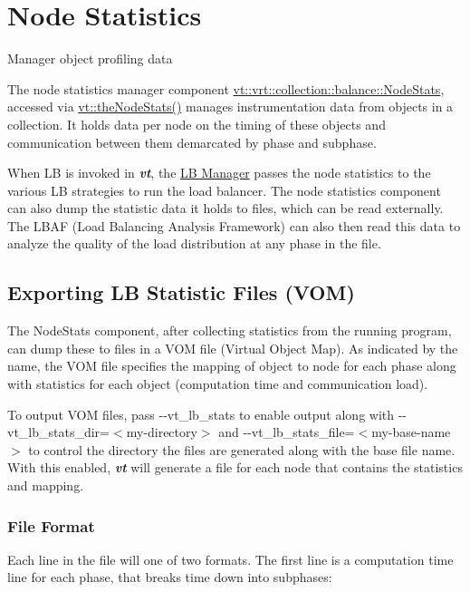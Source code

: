 \hypertarget{node-stats}{}\section{Node Statistics}\label{node-stats}
Manager object profiling data

The node statistics manager component {\ttfamily \hyperlink{structvt_1_1vrt_1_1collection_1_1balance_1_1_node_stats}{vt\+::vrt\+::collection\+::balance\+::\+Node\+Stats}}, accessed via {\ttfamily \hyperlink{namespacevt_ae1526efa346612ad330d9a628e596c54}{vt\+::the\+Node\+Stats()}} manages instrumentation data from objects in a collection. It holds data per node on the timing of these objects and communication between them demarcated by phase and subphase.

When LB is invoked in {\bfseries {\itshape vt}}, the \hyperlink{lb-manager}{LB Manager} passes the node statistics to the various LB strategies to run the load balancer. The node statistics component can also dump the statistic data it holds to files, which can be read externally. The L\+B\+AF (Load Balancing Analysis Framework) can also then read this data to analyze the quality of the load distribution at any phase in the file.\hypertarget{node-stats_export-lb-stats-file}{}\subsection{Exporting L\+B Statistic Files (\+V\+O\+M)}\label{node-stats_export-lb-stats-file}
The {\ttfamily Node\+Stats} component, after collecting statistics from the running program, can dump these to files in a V\+OM file (Virtual Object Map). As indicated by the name, the V\+OM file specifies the mapping of object to node for each phase along with statistics for each object (computation time and communication load).

To output V\+OM files, pass {\ttfamily -\/-\/vt\+\_\+lb\+\_\+stats} to enable output along with {\ttfamily -\/-\/vt\+\_\+lb\+\_\+stats\+\_\+dir=$<$my-\/directory$>$} and {\ttfamily -\/-\/vt\+\_\+lb\+\_\+stats\+\_\+file=$<$my-\/base-\/name$>$} to control the directory the files are generated along with the base file name. With this enabled, {\bfseries {\itshape vt}} will generate a file for each node that contains the statistics and mapping.\hypertarget{node-stats_stats-file-format}{}\subsubsection{File Format}\label{node-stats_stats-file-format}
Each line in the file will one of two formats. The first line is a computation time line for each phase, that breaks time down into subphases\+:


